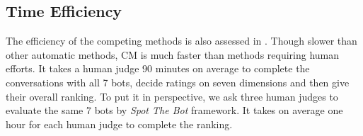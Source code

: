 \subsection{Time Efficiency}
\label{sec:time}
The efficiency of the competing methods is also assessed in . 
Though slower than other automatic methods,
CM is much faster than methods requiring human efforts. 
It takes a human judge 90 minutes on average to complete
the conversations with all 7 bots, decide ratings on seven dimensions and 
then give their overall ranking.
To put it in perspective, we ask three human judges to evaluate the same
7 bots by \textit{Spot The Bot} framework. It takes on average one hour for
each human judge to complete the ranking.


